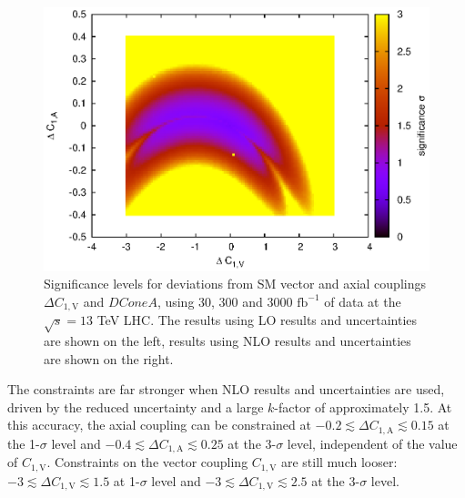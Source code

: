 \documentclass[preprint]{JHEP3} %
\def\invfb {\mathrm{fb}^{-1}}
\def\ConeV{C_{1,\mathrm{V}}}
\def\DConeA{\Delta C_{1,\mathrm{A}}}
\def\DConeV{\Delta C_{1,\mathrm{V}}}
\begin{document}
\begin{figure}[t]
\includegraphics[scale=0.6]{BLLNLO1223sig_SUA2_300_1.15.eps} 
\caption{\label{fig:viii} Significance levels for deviations from SM vector and axial couplings $\DConeV$ and $DConeA$,  using 30, 300 and 3000 $\invfb$ of data at the $\sqrt{s}=13$ TeV LHC. 
The results using LO results and uncertainties are shown on the left, results using NLO results and uncertainties are shown on the right.}
\end{figure}


The constraints are far stronger when NLO results and uncertainties are used, driven by the reduced uncertainty and a large $k$-factor of approximately 1.5. 
At this accuracy, the axial coupling can be constrained at $-0.2 \lesssim \DConeA \lesssim 0.15$ at the 1-$\sigma$ level and $-0.4 \lesssim \DConeA \lesssim 0.25$ 
at the 3-$\sigma$ level, independent of the value of $\ConeV$. Constraints on the vector coupling $\ConeV$ are still much looser: 
$-3 \lesssim \DConeV \lesssim 1.5$ at 1-$\sigma$ level and $-3 \lesssim \DConeV \lesssim 2.5$ at the 3-$\sigma$ level.
\end{document}

